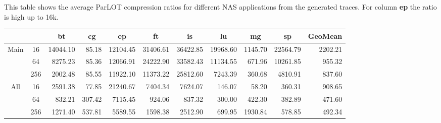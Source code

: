 \label{t_compRatio}

\caption{This table shows the average ParLOT compression ratios for different NAS applications from the generated traces. For column \textbf{ep} the ratio is high up to 16k. }

\begin{tabular}{cc|rrrrrrrr|r|}
\cline{3-11}
\multicolumn{1}{l}{} & \multicolumn{1}{l|}{} & \multicolumn{1}{c}{bt} & \multicolumn{1}{c}{cg} & \multicolumn{1}{c}{ep} & \multicolumn{1}{c}{ft} & \multicolumn{1}{c}{is} & \multicolumn{1}{c}{lu} & \multicolumn{1}{c}{mg} & \multicolumn{1}{c|}{sp} & \multicolumn{1}{c|}{GeoMean} \\ \hline
\multicolumn{1}{|c|}{\multirow{3}{*}{Main}} & 16 & 14044.10 & 85.18 & 12104.45 & 31406.61 & 36422.85 & 19968.60 & 1145.70 & 22564.79 & 2202.21 \\
\multicolumn{1}{|c|}{} & 64 & 8275.23 & 85.36 & 12066.91 & 24222.90 & 33582.43 & 11134.55 & 671.96 & 10261.85 & 955.32 \\
\multicolumn{1}{|c|}{} & 256 & 2002.48 & 85.55 & 11922.10 & 11373.22 & 25812.60 & 7243.39 & 360.68 & 4810.91 & 837.60 \\ \hline
\multicolumn{1}{|c|}{\multirow{3}{*}{All}} & 16 & 2591.38 & 77.85 & 21240.67 & 7404.34 & 7624.07 & 146.07 & 58.20 & 360.31 & 908.65 \\
\multicolumn{1}{|c|}{} & 64 & 832.21 & 307.42 & 7115.45 & 924.06 & 837.32 & 300.00 & 422.30 & 382.89 & 471.60 \\
\multicolumn{1}{|c|}{} & 256 & 1271.40 & 537.81 & 5589.55 & 1598.38 & 2512.90 & 699.95 & 1930.84 & 578.85 & 492.34 \\ \hline
\end{tabular}